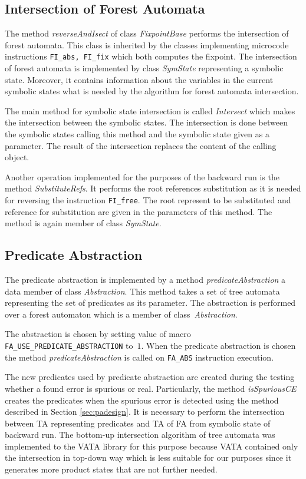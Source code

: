 \subsection{Intersection of Forest Automata}
\label{subsec:isectimpl}

The method \emph{reverseAndIsect} of class \emph{FixpointBase}
performs the intersection of forest automata.
This class is inherited by the classes implementing microcode
instructions {\tt FI\_abs, FI\_fix} which both computes the fixpoint.
The intersection of forest automata is implemented by class \emph{SymState}
representing a symbolic state.
Moreover, it contains information about the variables in the current
symbolic states what is needed by the algorithm for forest automata intersection.

The main method for symbolic state intersection is called \emph{Intersect}
which makes the intersection between the symbolic states.
The intersection is done between the symbolic states calling
this method and the symbolic state given as a parameter.
The result of the intersection replaces the content of the calling object.

Another operation implemented for the purposes of the backward run is
the method \emph{SubstituteRefs}.
It performs the root references substitution as it is needed
for reversing the instruction {\tt FI\_free}.
The root represent to be substituted and reference for substitution are
given in the parameters of this method.
The method is again member of class \emph{SymState}.

\subsection{Predicate Abstraction}
\label{subsec:paimpl}

The predicate abstraction is implemented by a method \emph{predicateAbstraction}
a data member of class \emph{Abstraction}.
This method takes a set of tree automata representing the set of predicates
as its parameter.
The abstraction is performed over a forest automaton which is a member of
class~\emph{Abstraction}.

The abstraction is chosen by setting value of macro
{\tt FA\_USE\_PREDICATE\_ABSTRACTION} to~$1$.
When the predicate abstraction is chosen the method \emph{predicateAbstraction}
is called on {\tt FA\_ABS} instruction execution.

The new predicates used by predicate abstraction are created during
the testing whether a found error is spurious or real.
Particularly, the method \emph{isSpuriousCE} creates the predicates
when the spurious error is detected using the method described
in Section \ref{sec:padesign}.
It is necessary to perform the intersection between TA representing
predicates and TA of FA from symbolic state of backward run.
The bottom-up intersection algorithm of tree automata was implemented
to the VATA library for this purpose because VATA contained only the
intersection in top-down way which is less suitable for our purposes since
it generates more product states that are not further needed.

